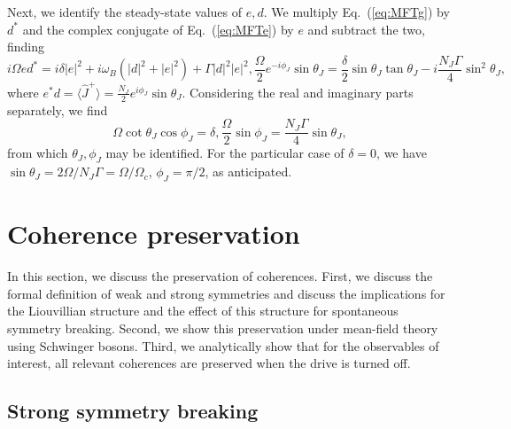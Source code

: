 Next, we identify the steady-state values of $e, d$. We multiply Eq.~(\ref{eq:MFTg}) by $d^*$ and the complex conjugate of Eq.~(\ref{eq:MFTe}) by $e$ and subtract the two, finding
\begin{subequations}
    \begin{equation}
        i \Omega e d^* = i \delta |e|^2 + i \omega_B(|d|^2 + |e|^2) + \Gamma |d|^2 |e|^2,
    \end{equation}
    \begin{equation}
        \frac{\Omega}{2}  e^{-i \phi_J} \sin \theta_J=  \frac{\delta}{2} \sin \theta_J\tan \theta_J - i \frac{N_J \Gamma}{4} \sin^2 \theta_J,
    \end{equation}
\end{subequations}
where $e^* d = \langle \hat J^+ \rangle = \frac{N_J}{2} e^{i \phi_J} \sin \theta_J$.
Considering the real and imaginary parts separately, we find
\begin{subequations}
    \begin{equation}
        \Omega \cot \theta_J\cos \phi_J = \delta,
    \end{equation}
    \begin{equation}
        \frac{\Omega}{2} \sin \phi_J = \frac{N_J \Gamma}{4} \sin \theta_J,
    \end{equation}
\end{subequations}
from which $\theta_J, \phi_J$ may be identified. For the particular case of $\delta = 0$, we have $\sin \theta_J= 2 \Omega/N_J \Gamma = \Omega/\Omega_c$, $\phi_J = \pi/2$, as anticipated. 


\section{Coherence preservation}
\label{sec:coherence}

In this section, we discuss the preservation of coherences. First, we discuss the formal definition of weak and strong symmetries and discuss the implications for the Liouvillian structure and the effect of this structure for spontaneous symmetry breaking. Second, we show this preservation under mean-field theory using Schwinger bosons. Third, we analytically show that for the observables of interest, all relevant coherences are preserved when the drive is turned off.

\subsection{Strong symmetry breaking}

